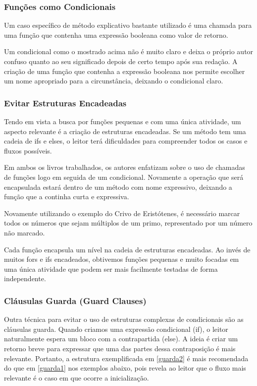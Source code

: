 \subsubsection{Funções como Condicionais}
Um caso específico de método explicativo bastante utilizado é uma chamada para uma função que contenha uma expressão booleana como valor de retorno.
	


Um condicional como o mostrado acima não é muito claro e deixa o próprio autor confuso quanto ao seu significado depois de certo tempo após sua redação. A criação de uma função que contenha a expressão booleana nos permite escolher um nome apropriado para a circunstância, deixando o condicional claro.



\subsubsection{Evitar Estruturas Encadeadas}
Tendo em vista a busca por funções pequenas e com uma única atividade, um aspecto relevante é a criação de estruturas encadeadas. Se um método tem uma cadeia de ifs e elses, o leitor terá dificuldades para compreender todos os casos e fluxos possíveis.
	
Em ambos os livros trabalhados, os autores enfatizam sobre o uso de chamadas de funções logo em seguida de um condicional. Novamente a operação que será encapsulada estará dentro de um método com nome expressivo, deixando a função que a continha curta e expressiva.
	
Novamente utilizando o exemplo do Crivo de Eristótenes, é necessário marcar todos os números que sejam múltiplos de um primo, representado por um número não marcado.



Cada função encapsula um nível na cadeia de estruturas encadeadas. Ao invés de muitos fors e ifs encadeados, obtivemos funções pequenas e muito focadas em uma única atividade que podem ser mais facilmente testadas de forma independente.

\subsubsection{Cláusulas Guarda (Guard Clauses)}
Outra técnica para evitar o uso de estruturas complexas de condicionais são as cláusulas guarda. Quando criamos uma expressão condicional (if), o leitor naturalmente espera um bloco com a contrapartida (else). A ideia é criar um retorno breve para expressar que uma das partes dessa contraposição é mais relevante. Portanto, a estrutura exemplificada em \ref{guarda2} é mais recomendada do que em \ref{guarda1} nos exemplos abaixo, pois revela ao leitor que o fluxo mais relevante é o caso em que ocorre a inicialização.

